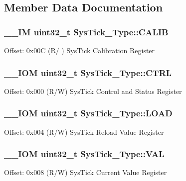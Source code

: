 \subsection{Member Data Documentation}
\hypertarget{struct_sys_tick___type_afcadb0c6d35b21cdc0018658a13942de}{
\subsubsection[{C\-A\-L\-I\-B}]{\setlength{\rightskip}{0pt plus 5cm}\-\_\-\-\_\-\-I\-M uint32\-\_\-t Sys\-Tick\-\_\-\-Type\-::\-C\-A\-L\-I\-B}}\label{struct_sys_tick___type_afcadb0c6d35b21cdc0018658a13942de}
Offset\-: 0x00\-C (R/ ) Sys\-Tick Calibration Register \hypertarget{struct_sys_tick___type_a875e7afa5c4fd43997fb544a4ac6e37e}{
\subsubsection[{C\-T\-R\-L}]{\setlength{\rightskip}{0pt plus 5cm}\-\_\-\-\_\-\-I\-O\-M uint32\-\_\-t Sys\-Tick\-\_\-\-Type\-::\-C\-T\-R\-L}}\label{struct_sys_tick___type_a875e7afa5c4fd43997fb544a4ac6e37e}
Offset\-: 0x000 (R/\-W) Sys\-Tick Control and Status Register \hypertarget{struct_sys_tick___type_a4780a489256bb9f54d0ba8ed4de191cd}{
\subsubsection[{L\-O\-A\-D}]{\setlength{\rightskip}{0pt plus 5cm}\-\_\-\-\_\-\-I\-O\-M uint32\-\_\-t Sys\-Tick\-\_\-\-Type\-::\-L\-O\-A\-D}}\label{struct_sys_tick___type_a4780a489256bb9f54d0ba8ed4de191cd}
Offset\-: 0x004 (R/\-W) Sys\-Tick Reload Value Register \hypertarget{struct_sys_tick___type_a9b5420d17e8e43104ddd4ae5a610af93}{
\subsubsection[{V\-A\-L}]{\setlength{\rightskip}{0pt plus 5cm}\-\_\-\-\_\-\-I\-O\-M uint32\-\_\-t Sys\-Tick\-\_\-\-Type\-::\-V\-A\-L}}\label{struct_sys_tick___type_a9b5420d17e8e43104ddd4ae5a610af93}
Offset\-: 0x008 (R/\-W) Sys\-Tick Current Value Register 

